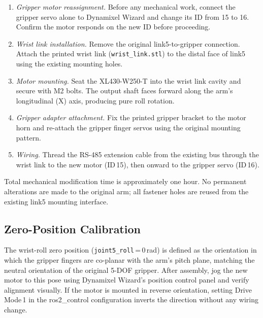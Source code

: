 \documentclass[conference]{IEEEtran}
\begin{document}
		\begin{enumerate}
			\item \textit{Gripper motor reassignment.}
			Before any mechanical work, connect the gripper servo alone
			to Dynamixel Wizard and change its ID from 15 to 16.
			Confirm the motor responds on the new ID before proceeding.
			
			\item \textit{Wrist link installation.}
			Remove the original link5-to-gripper connection. Attach the
			printed wrist link (\texttt{wrist\_link.stl}) to the distal
			face of link5 using the existing mounting holes.
			
			\item \textit{Motor mounting.}
			Seat the XL430-W250-T into the wrist link cavity and secure
			with M2 bolts. The output shaft faces forward along the
			arm's longitudinal (X) axis, producing pure roll rotation.
			
			\item \textit{Gripper adapter attachment.}
			Fix the printed gripper bracket to the motor horn and
			re-attach the gripper finger servos using the original
			mounting pattern.
			
			\item \textit{Wiring.}
			Thread the RS-485 extension cable from the existing bus
			through the wrist link to the new motor (ID\,15), then
			onward to the gripper servo (ID\,16).
		\end{enumerate}
		
		Total mechanical modification time is approximately one hour. No
		permanent alterations are made to the original arm; all fastener
		holes are reused from the existing link5 mounting interface.
		
		\subsection{Zero-Position Calibration}
		
		The wrist-roll zero position (\texttt{joint5\_roll}\,=\,0\,rad) is
		defined as the orientation in which the gripper fingers are co-planar
		with the arm's pitch plane, matching the neutral orientation of the
		original 5-DOF gripper. After assembly, jog the new motor to this
		pose using Dynamixel Wizard's position control panel and verify
		alignment visually. If the motor is mounted in reverse orientation,
		setting Drive Mode\,1 in the ros2\_control configuration inverts the
		direction without any wiring change.
		
\end{document}
